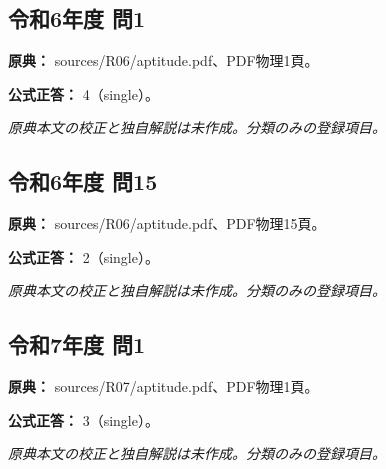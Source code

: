 \subsection{令和6年度 問1}
\label{q:r06-reg-apt-01}

\noindent\textbf{原典：} sources/R06/aptitude.pdf、PDF物理1頁。

\textbf{公式正答：} 4（single）。

\par\textit{原典本文の校正と独自解説は未作成。分類のみの登録項目。}

\subsection{令和6年度 問15}
\label{q:r06-reg-apt-15}

\noindent\textbf{原典：} sources/R06/aptitude.pdf、PDF物理15頁。

\textbf{公式正答：} 2（single）。

\par\textit{原典本文の校正と独自解説は未作成。分類のみの登録項目。}

\subsection{令和7年度 問1}
\label{q:r07-reg-apt-01}

\noindent\textbf{原典：} sources/R07/aptitude.pdf、PDF物理1頁。

\textbf{公式正答：} 3（single）。

\par\textit{原典本文の校正と独自解説は未作成。分類のみの登録項目。}
